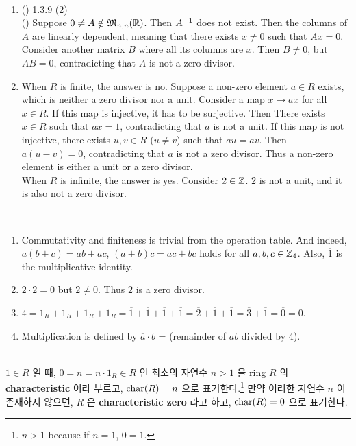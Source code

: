 \\
\begin{enumerate}
	\item (\mimp) 1.3.9 (2)\\
	(\mimpb) Suppose $0\neq A\notin \mathfrak{M}_{n, n}(\mathbb{R})$. Then $A^{-1}$ does not exist. Then the columns of $A$ are linearly dependent, meaning that there exists $x\neq 0$ such that $Ax=0$. Consider another matrix $B$ where all its columns are $x$. Then $B\neq 0$, but $AB = 0$, contradicting that $A$ is not a zero divisor.
	\item When $R$ is finite, the answer is no. Suppose a non-zero element $a\in R$ exists, which is neither a zero divisor nor a unit. Consider a map $x\mapsto ax$ for all $x\in R$. If this map is injective, it has to be surjective. Then There exists $x\in R$ such that $ax = 1$, contradicting that $a$ is not a unit. If this map is not injective, there exists $u, v\in R$ ($u\neq v$) such that $au = av$. Then $a(u-v) = 0$, contradicting that $a$ is not a zero divisor. Thus a non-zero element is either a unit or a zero divisor.\\
	When $R$ is infinite, the answer is yes. Consider $2\in \mathbb{Z}$. $2$ is not a unit, and it is also not a zero divisor. 
\end{enumerate}~
\\
\begin{enumerate}
	\item Commutativity and finiteness is trivial from the operation table. And indeed, $a(b+c)=ab+ac$, $(a+b)c = ac+bc$ holds for all $a, b, c\in \mathbb{Z}_4$. Also, $\overline{1}$ is the multiplicative identity.
	\item $\overline{2}\cdot \overline{2} = \overline{0}$ but $\overline{2} \neq \overline{0}$. Thus $\overline{2}$ is a zero divisor.
	\item $4 = 1_R + 1_R + 1_R + 1_R = \overline{1} + \overline{1} + \overline{1} +\overline{1} = \overline{2} + \overline{1} + \overline{1} = \overline{3} + \overline{1} = \overline{0} = 0$.
	\item Multiplication is defined by $\overline{a}\cdot \overline{b}$ = (remainder of $ab$ divided by 4).
\end{enumerate}~
\\
 $1\in R$ 일 때, $0=n=n\cdot 1_R \in R$ 인 최소의 자연수 $n > 1$ 을 ring $R$ 의 \textbf{characteristic} 이라 부르고, $\operatorname{char}(R) = n$ 으로 표기한다.\footnote{$n>1$ because if $n = 1$, $0=1$.} 만약 이러한 자연수 $n$ 이 존재하지 않으면, $R$ 은 \textbf{characteristic zero} 라고 하고, $\operatorname{char}(R) = 0$ 으로 표기한다.\\
